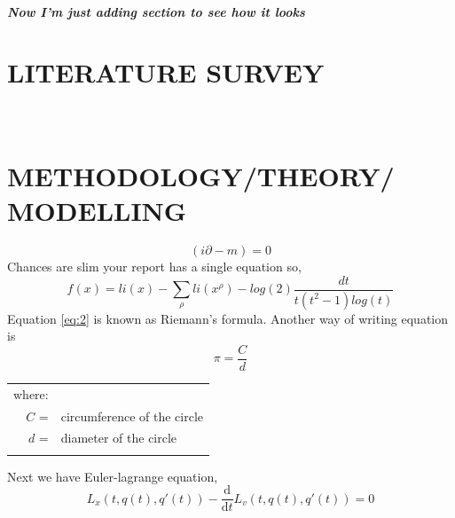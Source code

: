 \documentclass[12pt,a4paper]{report}
\begin{document}
\paragraph{Now I'm just adding section to see how it looks}

\lipsum[1]


\chapter{LITERATURE SURVEY}

\lipsum[3-8] \\

\lipsum
\chapter{\MakeUppercase{Methodology/Theory/ Modelling}}
\lipsum[1]
\[(i \partial -m) = 0 \]
Chances are slim your report has a single equation so,
\begin{equation}  \label{eq:2}
 f(x) = li(x)-\sum_{\rho}li(x^{\rho}) -  log(2) \frac{dt}{t(t^{2}-1)log(t)}
\end{equation}
Equation \ref{eq:2} is known as Riemann's formula. Another way of writing equation is \\
\begin{equation}  \label{eq:3}
 \pi = \frac{C}{d}
\end{equation}
\hspace*{5cm} %
\begin{tabular}{rl}
where:\\
    $C$ =& circumference of the circle \\
    $d$ =& diameter of the circle  \\
    \\
\end{tabular}

Next we have Euler-lagrange equation, 
\begin{equation}  \label{eq:4}
L_{x}(t,q(t),q'(t)) - \frac{\mathrm{d}}
{\mathrm{d}t} L_{v}(t,q(t),q'(t))= 0
\end{equation}
\end{document}
